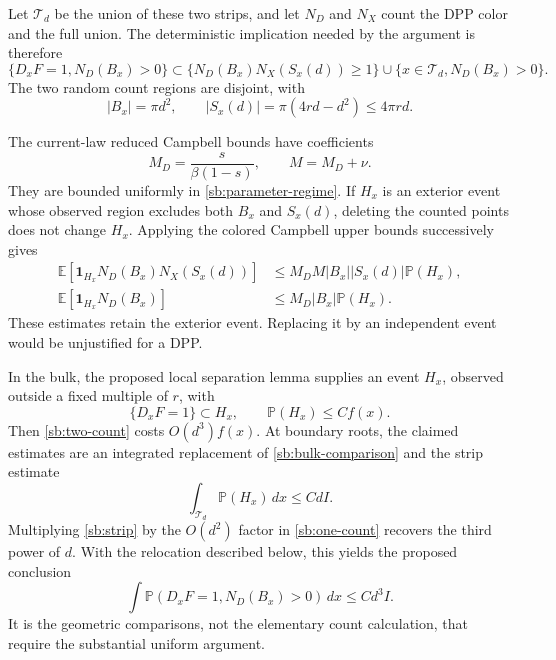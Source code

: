 \documentclass[11pt,a4paper]{article}
\theoremstyle{definition}
\theoremstyle{remark}
\numberwithin{equation}{section}
\begin{document}
Let $\mathcal T_d$ be the union of these two strips, and let $N_D$ and
$N_X$ count the DPP color and the full union. The deterministic
implication needed by the argument is therefore
\begin{equation}
 \{D_xF=1, N_D(B_x)>0\}
 \subset
 \{N_D(B_x)N_X(S_x(d))\ge1\}
       \cup\{x\in\mathcal T_d, N_D(B_x)>0\}.
 \label{sb:near-implication}
\end{equation}
The two random count regions are disjoint, with
\begin{equation}
 |B_x|=\pi d^2,
 \qquad |S_x(d)|=\pi(4rd-d^2)\le4\pi rd.
 \label{sb:areas}
\end{equation}

The current-law reduced Campbell bounds have coefficients
\[
 M_D=\frac{s}{\beta(1-s)},\qquad M=M_D+\nu.
\]
They are bounded uniformly in \eqref{sb:parameter-regime}. If $H_x$ is
an exterior event whose observed region excludes both $B_x$ and
$S_x(d)$, deleting the counted points does not change $H_x$. Applying
the colored Campbell upper bounds successively gives
\begin{align}
 \mathbb E[\mathbf1_{H_x}N_D(B_x)N_X(S_x(d))]
   &\le M_D M |B_x||S_x(d)|\mathbb P(H_x),
 \label{sb:two-count}\\
 \mathbb E[\mathbf1_{H_x}N_D(B_x)]
   &\le M_D|B_x|\mathbb P(H_x).
 \label{sb:one-count}
\end{align}
These estimates retain the exterior event. Replacing it by an
independent event would be unjustified for a DPP.

In the bulk, the proposed local separation lemma supplies an event
$H_x$, observed outside a fixed multiple of $r$, with
\begin{equation}
 \{D_xF=1\}\subset H_x,
 \qquad \mathbb P(H_x)\le C f(x).
 \label{sb:bulk-comparison}
\end{equation}
Then \eqref{sb:two-count} costs $O(d^3)f(x)$. At boundary roots,
the claimed estimates are an integrated replacement of
\eqref{sb:bulk-comparison} and the strip estimate
\begin{equation}
 \int_{\mathcal T_d}\mathbb P(H_x)\,dx\le Cd I.
 \label{sb:strip}
\end{equation}
Multiplying \eqref{sb:strip} by the $O(d^2)$ factor in
\eqref{sb:one-count} recovers the third power of $d$. With the
relocation described below, this yields the proposed conclusion
\begin{equation}
 \int\mathbb P(D_xF=1, N_D(B_x)>0)\,dx\le Cd^3 I.
 \label{sb:near-integrated}
\end{equation}
It is the geometric comparisons, not the elementary count calculation,
that require the substantial uniform argument.
\end{document}
